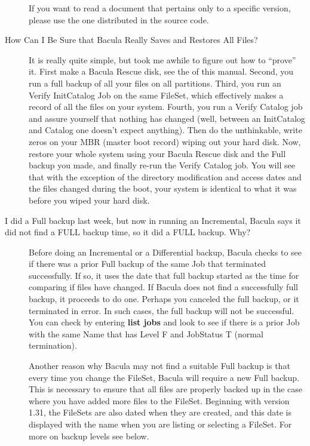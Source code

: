 \begin{description}
If you want to read a document that pertains only to a specific  version,
please use the one distributed in the source code.  

\label{sure}

\item [How Can I Be Sure that Bacula Really Saves and Restores All Files? ]
    It is really quite simple, but took me awhile to figure
   out how to ``prove'' it.  First make a Bacula Rescue disk, see the
    of this manual.
   Second, you run a full backup of all your files on all partitions.
   Third, you run an Verify InitCatalog Job on the same FileSet, which
   effectively makes a record of all the files on your system.  Fourth, you
   run a Verify Catalog job and assure yourself that nothing has changed
   (well, between an InitCatalog and Catalog one doesn't expect anything).
   Then do the unthinkable, write zeros on your MBR (master boot record)
   wiping out your hard disk.  Now, restore your whole system using your
   Bacula Rescue disk and the Full backup you made, and finally re-run the
   Verify Catalog job.  You will see that with the exception of the
   directory modification and access dates and the files changed during the
   boot, your system is identical to what it was before you wiped your hard
   disk.

\label{upgrade}
\item [I did a Full backup last week, but now in running an Incremental,
   Bacula  says it did not find a FULL backup time, so it did a FULL backup. Why?]
    Before doing an Incremental or a Differential
   backup, Bacula checks to see if there was a prior Full backup of the
   same Job that terminated successfully.  If so, it uses the date that
   full backup started as the time for comparing if files have changed.  If
   Bacula does not find a successfully full backup, it proceeds to do one.
   Perhaps you canceled the full backup, or it terminated in error.  In
   such cases, the full backup will not be successful.  You can check by
   entering {\bf list jobs} and look to see if there is a prior Job with
   the same Name that has Level F and JobStatus T (normal termination).

   Another reason why Bacula may not find a suitable Full backup is that
   every time you change the FileSet, Bacula will require a new Full
   backup.  This is necessary to ensure that all files are properly backed
   up in the case where you have added more files to the FileSet.
   Beginning with version 1.31, the FileSets are also dated when they are
   created, and this date is displayed with the name when you are listing
   or selecting a FileSet.  For more on backup levels see below.


\end{description}
